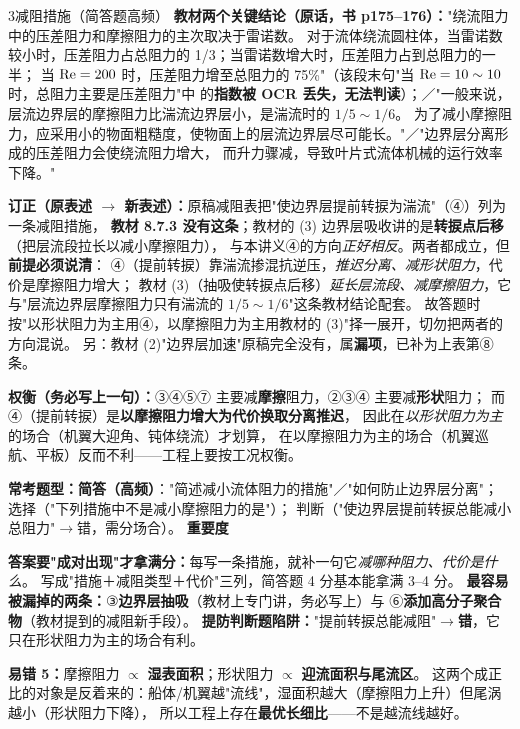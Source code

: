 \begin{kaodian}{3}{减阻措施（简答题高频）}
\textbf{教材两个关键结论（原话，书 p175--176）：}"绕流阻力中的压差阻力和摩擦阻力的主次取决于雷诺数。
对于流体绕流圆柱体，当雷诺数较小时，压差阻力占总阻力的 1/3；当雷诺数增大时，压差阻力占到总阻力的一半；
当 $\mathrm{Re}=200$ 时，压差阻力增至总阻力的 75\%"（该段末句"当 $\mathrm{Re}=10\sim10$ 时，总阻力主要是压差阻力"中
的\textbf{指数被 OCR 丢失，无法判读}）；／"一般来说，层流边界层的摩擦阻力比湍流边界层小，是湍流时的 $1/5\sim1/6$。
为了减小摩擦阻力，应采用小的物面粗糙度，使物面上的层流边界层尽可能长。"／"边界层分离形成的压差阻力会使绕流阻力增大，
而升力骤减，导致叶片式流体机械的运行效率下降。"

\begin{tishi}
\textbf{订正（原表述 $\to$ 新表述）：}原稿减阻表把"使边界层提前转捩为湍流"（④）列为一条减阻措施，
\textbf{教材 8.7.3 没有这条}；教材的 (3) 边界层吸收讲的是\textbf{转捩点后移}（把层流段拉长以减小摩擦阻力），
与本讲义④的方向\emph{正好相反}。两者都成立，但\textbf{前提必须说清}：
④（提前转捩）靠湍流掺混抗逆压，\emph{推迟分离、减形状阻力}，代价是摩擦阻力增大；
教材 (3)（抽吸使转捩点后移）\emph{延长层流段、减摩擦阻力}，它与"层流边界层摩擦阻力只有湍流的 $1/5\sim1/6$"这条教材结论配套。
故答题时按"以形状阻力为主用④，以摩擦阻力为主用教材的 (3)"择一展开，切勿把两者的方向混说。
另：教材 (2)"边界层加速"原稿完全没有，属\textbf{漏项}，已补为上表第⑧条。
\end{tishi}

\textbf{权衡（务必写上一句）：}③④⑤⑦ 主要减\textbf{摩擦}阻力，②③④ 主要减\textbf{形状}阻力；
而④（提前转捩）是\textbf{以摩擦阻力增大为代价换取分离推迟}，
因此在\emph{以形状阻力为主}的场合（机翼大迎角、钝体绕流）才划算，
在以摩擦阻力为主的场合（机翼巡航、平板）反而不利——工程上要按工况权衡。

\textbf{常考题型：}\textbf{简答（高频）}："简述减小流体阻力的措施"／"如何防止边界层分离"；
选择（"下列措施中不是减小摩擦阻力的是"）；
判断（"使边界层提前转捩总能减小总阻力"$\to$错，需分场合）。
\textbf{重要度 }\quad{}\quad{}

\begin{banfa}
\textbf{答案要"成对出现"才拿满分：}每写一条措施，就补一句它\emph{减哪种阻力、代价是什么}。
写成"措施＋减阻类型＋代价"三列，简答题 4 分基本能拿满 3--4 分。
\textbf{最容易被漏掉的两条：}③\textbf{边界层抽吸}（教材上专门讲，务必写上）与
⑥\textbf{添加高分子聚合物}（教材提到的减阻新手段）。
\textbf{提防判断题陷阱：}"提前转捩总能减阻"$\to$\textbf{错}，它只在形状阻力为主的场合有利。
\end{banfa}

\begin{yicuo}
\textbf{易错 5：}摩擦阻力 $\propto$ \textbf{湿表面积}；形状阻力 $\propto$ \textbf{迎流面积与尾流区}。
这两个成正比的对象是反着来的：船体/机翼越"流线"，湿面积越大（摩擦阻力上升）但尾涡越小（形状阻力下降），
所以工程上存在\textbf{最优长细比}——不是越流线越好。
\end{yicuo}
\end{kaodian}

